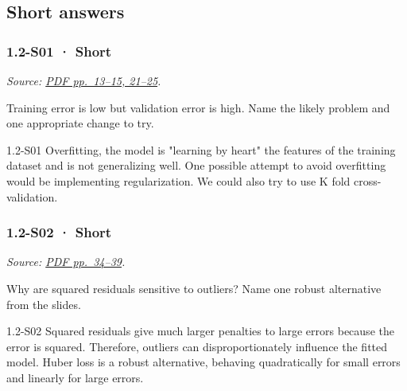 \subsection{Short answers}\label{short-answers-1}

\noindent\begin{minipage}{\linewidth}

\subsubsection{1.2-S01 · Short}\label{s01-short-1}

\emph{Source:
\href{../Lecture\%20Slides/1.2.\%20Shallow\%20Learning.pdf\#page=13}{PDF
pp.~13--15, 21--25}.}

Training error is low but validation error is high. Name the likely
problem and one appropriate change to try.

\begin{solution}[20mm]{1.2-S01}
Overfitting, the model is "learning by heart" the features of the training dataset and is not generalizing well. One possible attempt to avoid overfitting would be implementing regularization. We could also try to use K fold cross-validation.
\end{solution}
\end{minipage}\par\medskip

\noindent\begin{minipage}{\linewidth}

\subsubsection{1.2-S02 · Short}\label{s02-short-1}

\emph{Source:
\href{../Lecture\%20Slides/1.2.\%20Shallow\%20Learning.pdf\#page=34}{PDF
pp.~34--39}.}

Why are squared residuals sensitive to outliers? Name one robust
alternative from the slides.

\begin{solution}[20mm]{1.2-S02}
Squared residuals give much larger penalties to large errors because the error is squared. Therefore, outliers can disproportionately influence the fitted model. Huber loss is a robust alternative, behaving quadratically for small errors and linearly for large errors.
\end{solution}
\end{minipage}\par\medskip

